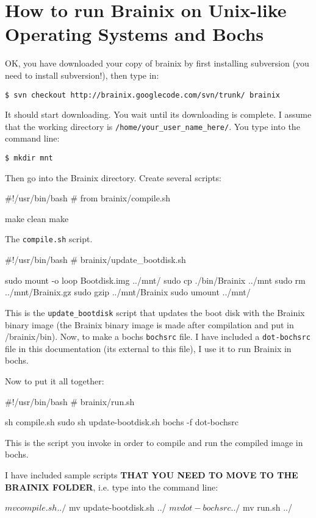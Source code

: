 \chapter{How to run Brainix on Unix-like Operating Systems and Bochs}

OK, you have downloaded your copy of brainix by first installing subversion (you need to install subversion!), then type in:

\verb|$ svn checkout http://brainix.googlecode.com/svn/trunk/ brainix|

It should start downloading. You wait until its downloading is complete. I assume that the working directory is \verb|/home/your_user_name_here/|. You type into the command line:

\verb|$ mkdir mnt|

Then go into the Brainix directory. Create several scripts:
\begin{code}
#!/usr/bin/bash
# from brainix/compile.sh

make clean
make
\end{code}
The \verb|compile.sh| script.
\begin{code}
#!/usr/bin/bash
# brainix/update_bootdisk.sh

sudo mount -o loop Bootdisk.img ../mnt/
sudo cp ./bin/Brainix ../mnt
sudo rm ../mnt/Brainix.gz
sudo gzip ../mnt/Brainix
sudo umount ../mnt/
\end{code}
This is the \verb|update_bootdisk| script that updates the boot disk with the Brainix binary image (the Brainix binary image is made after compilation and put in /brainix/bin). Now, to make a bochs \verb|bochsrc| file. I have included a \verb|dot-bochsrc| file in this documentation (its external to this file), I use it to run Brainix in bochs.

Now to put it all together:
\begin{code}
#!/usr/bin/bash
# brainix/run.sh

sh compile.sh
sudo sh update-bootdisk.sh
bochs -f dot-bochsrc
\end{code}
This is the script you invoke in order to compile and run the compiled image in bochs.

I have included sample scripts \textbf{THAT YOU NEED TO MOVE TO THE BRAINIX FOLDER}, i.e. type into the command line:
\\
\begin{commandLine}
$ mv compile.sh ../
$ mv update-bootdisk.sh ../
$ mv dot-bochsrc ../
$ mv run.sh ../
\end{commandLine}
